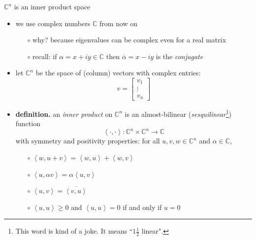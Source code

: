 \documentclass[10pt,hyperref]{beamer}
\newcommand{\CC}{\mathbb{C}}
\newcommand{\ip}[2]{\left<#1,#2\right>}
\begin{document}
\begin{frame}{$\CC^n$ is an inner product space}

\begin{itemize}
\item we use complex numbers $\CC$ from now on
    \begin{itemize}
    \item[$\circ$] why? because eigenvalues can be complex even for a real matrix
    \item[$\circ$] recall: if $\alpha=x+iy \in \CC$ then $\overline{\alpha} = x-iy$ is the \emph{conjugate}
    \end{itemize}
\item let $\CC^n$ be the space of (column) vectors with complex entries:
\footnotesize
    $$v = \begin{bmatrix}
    v_1 \\ \vdots \\ v_n
    \end{bmatrix}$$
\normalsize
\vspace{-2mm}
\item \textbf{definition.} an \emph{inner product} on $\CC^n$ is an almost-bilinear (\emph{sesquilinear}\footnote{This word is kind of a joke.  It means ``$1\frac{1}{2}$ linear".}) function
    $$\ip{\cdot}{\cdot}:\CC^n\times \CC^n \to \CC$$
with symmetry and positivity properties: \quad for all $u,v,w \in \CC^n$ and $\alpha\in \CC$,
    \begin{itemize}
    \item[$\circ$] $\ip{w}{u+v} = \ip{w}{u} + \ip{w}{v}$
    \item[$\circ$] $\ip{u}{\alpha v} = \alpha \ip{u}{v}$
    \item[$\circ$] $\ip{u}{v} = \overline{\ip{v}{u}}$
    \item[$\circ$] $\ip{u}{u} \ge 0$ and $\ip{u}{u}=0$ if and only if $u=0$
    \end{itemize}
\end{itemize}
\end{frame}
\end{document}
